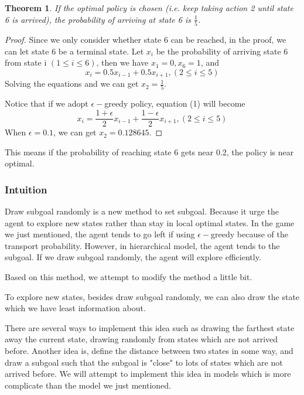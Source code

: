 \documentclass{article}
\newtheorem{theorem}{Theorem}
\begin{document}
\begin{spacing}{1.1}
    \begin{theorem}
        If the optimal policy is chosen (i.e. keep taking action 2 until state 6 is arrived), the probability of arriving at state 6 is $\frac{1}{5}$.
        \end{theorem}
        \begin{proof}
            Since we only consider whether state 6 can be reached, in the proof, we can let state 6 be a terminal state. Let $x_i$ be the probability of arriving state 6 from state i $(1\leq i \leq 6)$, then we have $x_1 = 0, x_6 = 1$, and
            \begin{equation}
                x_i = 0.5x_{i-1} + 0.5x_{i+1}, (2\leq i \leq 5)
            \end{equation}
            Solving the equations and we can get $x_2 = \frac{1}{5}$.
    
            Notice that if we adopt $\epsilon -$greedy policy, equation (1) will become
            \begin{equation}
                x_i = \frac{1 + \epsilon}{2}x_{i-1} + \frac{1 - \epsilon}{2}x_{i+1}, (2\leq i \leq 5)
            \end{equation}
            When $\epsilon = 0.1$, we can get $x_2 = 0.128645$.
        \end{proof}

    This means if the probability of reaching state 6 gets near 0.2, the policy is near optimal.
    \subsubsection{Intuition}

    Draw subgoal randomly is a new method to set subgoal. Because it urge the agent to explore new states rather than stay in local optimal states. In the game we just mentioned, the agent tends to go left if using $\epsilon-$greedy because of the transport probability. However, in hierarchical model, the agent tends to the subgoal. If we draw subgoal randomly, the agent will explore efficiently.

    Based on this method, we attempt to modify the method a little bit.

    To explore new states, besides draw subgoal randomly, we can also draw the state which we have least information about.

    There are several ways to implement this idea such as drawing the farthest state away the current state, drawing randomly from states which are not arrived before. Another idea is, define the distance between two states in some way, and draw a subgoal such that the subgoal is "close" to lots of states which are not arrived before. We will attempt to implement this idea in models which is more complicate than the model we just mentioned.


\end{spacing}
\end{document}
